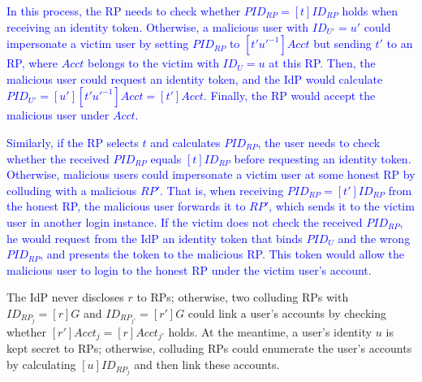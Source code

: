 \textcolor{blue}{In this process, the RP needs to check whether $PID_{RP} = [t]ID_{RP}$ holds when receiving an identity token.
Otherwise, a malicious user with $ID_{U'} = u'$ could impersonate a victim user by setting $PID_{RP}$ to $[t'u'^{-1}]Acct$ but sending $t'$ to an RP, where $Acct$ belongs to the victim with $ID_{U} = u$ at this RP.
Then, the malicious user could request an identity token,
 and the IdP would calculate $PID_{U'} = [u'][t'u'^{-1}]Acct = [t']Acct$.
Finally, the RP would accept the malicious user under $Acct$.} %

\textcolor{blue}{Similarly, if the RP selects $t$ and calculates $PID_{RP}$,
 the user needs to check whether the received $PID_{RP}$ equals $[t]ID_{RP}$ before requesting an identity token.
Otherwise, malicious users could impersonate a victim user at some honest RP by colluding with a malicious $RP'$.
That is, when receiving $PID_{RP}=[t']ID_{RP}$ from the honest RP, the malicious user forwards it to $RP'$, which sends it to the victim user in another login instance.
If the victim does not check the received $PID_{RP}$, he would request from the IdP an identity token that binds $PID_U$ and the wrong $PID_{RP}$, and presents the token to the malicious RP.
This token would allow the malicious user to login to the honest RP under the victim user's account.}

The IdP never discloses $r$ to RPs; otherwise, two colluding RPs with $ID_{RP_j} = [r]G$ and $ID_{RP_{j'}} = [r']G$ could link a user's accounts by checking whether $[r']Acct_j = [r]Acct_{j'}$ holds.
At the meantime,
a user's identity $u$ is kept secret to RPs; otherwise, colluding RPs could enumerate the user's accounts
        by calculating $[u]ID_{RP_j}$ and then link these accounts.




